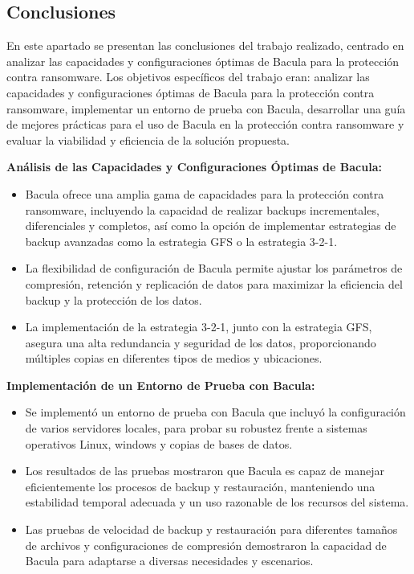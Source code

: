 

\subsection{Conclusiones}

En este apartado se presentan las conclusiones del trabajo realizado, centrado en analizar las capacidades y configuraciones óptimas de Bacula para la protección contra ransomware. Los objetivos específicos del trabajo eran: analizar las capacidades y configuraciones óptimas de Bacula para la protección contra ransomware, implementar un entorno de prueba con Bacula, desarrollar una guía de mejores prácticas para el uso de Bacula en la protección contra ransomware y evaluar la viabilidad y eficiencia de la solución propuesta.

\textbf{Análisis de las Capacidades y Configuraciones Óptimas de Bacula:}
\begin{itemize}
    \item Bacula ofrece una amplia gama de capacidades para la protección contra ransomware, incluyendo la capacidad de realizar backups incrementales, diferenciales y completos, así como la opción de implementar estrategias de backup avanzadas como la estrategia GFS o la estrategia 3-2-1.
    \item La flexibilidad de configuración de Bacula permite ajustar los parámetros de compresión, retención y replicación de datos para maximizar la eficiencia del backup y la protección de los datos.
    \item La implementación de la estrategia 3-2-1, junto con la estrategia GFS, asegura una alta redundancia y seguridad de los datos, proporcionando múltiples copias en diferentes tipos de medios y ubicaciones.
\end{itemize}

\textbf{Implementación de un Entorno de Prueba con Bacula:}
\begin{itemize}
    \item Se implementó un entorno de prueba con Bacula que incluyó la configuración de varios servidores locales, para probar su robustez frente a sistemas operativos Linux, windows y copias de bases de datos.
    \item Los resultados de las pruebas mostraron que Bacula es capaz de manejar eficientemente los procesos de backup y restauración, manteniendo una estabilidad temporal adecuada y un uso razonable de los recursos del sistema.
    \item Las pruebas de velocidad de backup y restauración para diferentes tamaños de archivos y configuraciones de compresión demostraron la capacidad de Bacula para adaptarse a diversas necesidades y escenarios.
\end{itemize}

